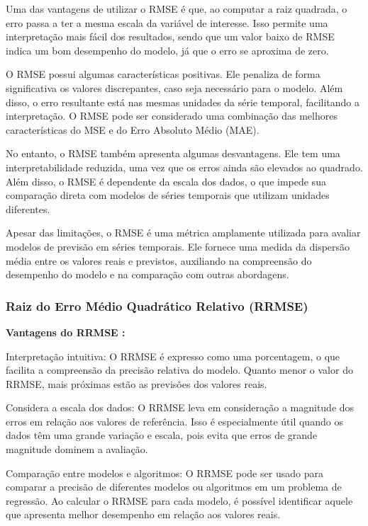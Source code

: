 Uma das vantagens de utilizar o RMSE é que, ao computar a raiz quadrada, o erro passa a ter a mesma escala da variável de interesse. Isso permite uma interpretação mais fácil dos resultados, sendo que um valor baixo de RMSE indica um bom desempenho do modelo, já que o erro se aproxima de zero.

O RMSE possui algumas características positivas. Ele penaliza de forma significativa os valores discrepantes, caso seja necessário para o modelo. Além disso, o erro resultante está nas mesmas unidades da série temporal, facilitando a interpretação. O RMSE pode ser considerado uma combinação das melhores características do MSE e do Erro Absoluto Médio (MAE).

No entanto, o RMSE também apresenta algumas desvantagens. Ele tem uma interpretabilidade reduzida, uma vez que os erros ainda são elevados ao quadrado. Além disso, o RMSE é dependente da escala dos dados, o que impede sua comparação direta com modelos de séries temporais que utilizam unidades diferentes.

Apesar das limitações, o RMSE é uma métrica amplamente utilizada para avaliar modelos de previsão em séries temporais. Ele fornece uma medida da dispersão média entre os valores reais e previstos, auxiliando na compreensão do desempenho do modelo e na comparação com outras abordagens.

\subsubsection{Raiz do Erro M\'edio Quadr\'atico Relativo (RRMSE)}\label{subsub:rrmse}

\noindent\textbf{Vantagens do RRMSE :}


Interpretação intuitiva: O RRMSE é expresso como uma porcentagem, o que facilita a compreensão da precisão relativa do modelo. Quanto menor o valor do RRMSE, mais próximas estão as previsões dos valores reais.
	
Considera a escala dos dados: O RRMSE leva em consideração a magnitude dos erros em relação aos valores de referência. Isso é especialmente útil quando os dados têm uma grande variação e escala, pois evita que erros de grande magnitude dominem a avaliação.
	
Comparação entre modelos e algoritmos: O RRMSE pode ser usado para comparar a precisão de diferentes modelos ou algoritmos em um problema de regressão. Ao calcular o RRMSE para cada modelo, é possível identificar aquele que apresenta melhor desempenho em relação aos valores reais.
	
